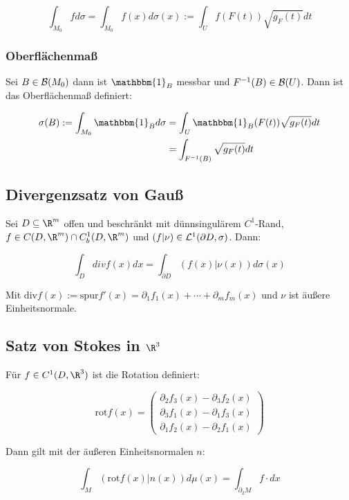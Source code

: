 \vspace{-4mm}
$$\int_{M_0} f d\sigma = \int_{M_0} f(x) d\sigma(x) := \int_U f(F(t))\sqrt{g_F(t)} dt$$

\subsubsection*{Oberflächenmaß}

Sei $B \in \mathcal{B}(M_0)$ dann ist $\mathbbm{1}_B$ messbar und $F^{-1}(B) \in \mathcal{B}(U)$. Dann ist das Oberflächenmaß definiert:

\vspace{-4mm}
\begin{align*}
\sigma(B) := \int_{M_0} \mathbbm{1}_B d\sigma &= \int_U \mathbbm{1}_B(F(t)) \sqrt{g_F(t)} dt\\
                             &= \int_{F^{-1}(B)} \sqrt{g_F(t)} dt
\end{align*}

\subsection*{Divergenzsatz von Gauß}

Sei $D \subseteq \R^m$ offen und beschränkt mit dünnsingulärem $C^1$-Rand, $f \in C(D,\R^m) \cap C_b^1(D,\R^m)$ und $(f|\nu) \in \mathcal{L}^1(\partial D,\sigma)$. Dann:

$$\int_D div f(x) dx = \int_{\partial D} (f(x)|\nu(x)) d\sigma(x)$$

Mit $\text{div} f(x) := \text{spur} f'(x) = \partial_1 f_1(x) + \cdots + \partial_m f_m(x)$ und $\nu$ ist äußere Einheitsnormale.

\subsection*{Satz von Stokes in $\R^3$}

Für $f \in C^1(D,\R^3)$ ist die Rotation definiert:

$$\text{rot} f(x) = \begin{pmatrix}
	\partial_2 f_3(x) - \partial_3 f_2(x) \\
	\partial_3 f_1(x) - \partial_1 f_3(x) \\
	\partial_1 f_2(x) - \partial_2 f_1(x)
\end{pmatrix}$$

Dann gilt mit der äußeren Einheitsnormalen $n$:

$$\int_M (\text{rot} f(x) | n(x)) d\mu(x) = \int_{\partial_2 M} f \cdot dx$$

